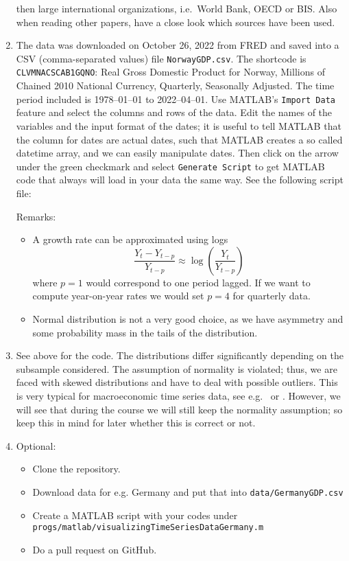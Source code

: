 \begin{enumerate}
  then large international organizations, i.e.\ World Bank, {OECD} or {BIS}.
Also when reading other papers, have a close look which sources have been used.
\item
The data was downloaded on October 26, 2022 from FRED and saved into a CSV (comma-separated values) file \texttt{NorwayGDP.csv}.
The shortcode is \texttt{CLVMNACSCAB1GQNO}: Real Gross Domestic Product for Norway, Millions of Chained 2010 National Currency, Quarterly, Seasonally Adjusted.
The time period included is {1978--01--01} to {2022--04--01}.
Use MATLAB's \texttt{Import Data} feature and select the columns and rows of the data.
Edit the names of the variables and the input format of the dates;
  it is useful to tell MATLAB that the column for dates are actual dates,
  such that MATLAB creates a so called datetime array,
  and we can easily manipulate dates.
Then click on the arrow under the green checkmark and select \texttt{Generate Script} to get MATLAB code that always will load in your data the same way.
See the following script file:

Remarks:
\begin{itemize}
\item A growth rate can be approximated using logs
\[\frac{Y_t - Y_{t-p}}{Y_{t-p}} \approx \log \left(\frac{Y_t}{Y_{t-p}}\right)\]
where \(p=1\) would correspond to one period lagged. If we want to compute year-on-year rates we would set \(p=4\) for quarterly data.
\item Normal distribution is not a very good choice, as we have asymmetry and some probability mass in the tails of the distribution.
\end{itemize}
\item See above for the code. The distributions differ significantly depending on the subsample considered.
The assumption of normality is violated; thus, we are faced with skewed distributions and have to deal with possible outliers.
This is very typical for macroeconomic time series data, see e.g.\ \textcite{Ascari.Fagiolo.Roventini_2015_FatTailDistributionsBusinessCycle} or \textcite{Fagiolo.Napoletano.Roventini_2008_AreOutputGrowthrate}.
However, we will see that during the course we will still keep the normality assumption;
  so keep this in mind for later whether this is correct or not.
\item Optional:
\begin{itemize}
\item Clone the repository.
\item Download data for e.g. Germany and put that into \texttt{data/GermanyGDP.csv}
\item Create a MATLAB script with your codes under\\\texttt{progs/matlab/visualizingTimeSeriesDataGermany.m}
\item Do a pull request on GitHub.
\end{itemize}
\end{enumerate}
